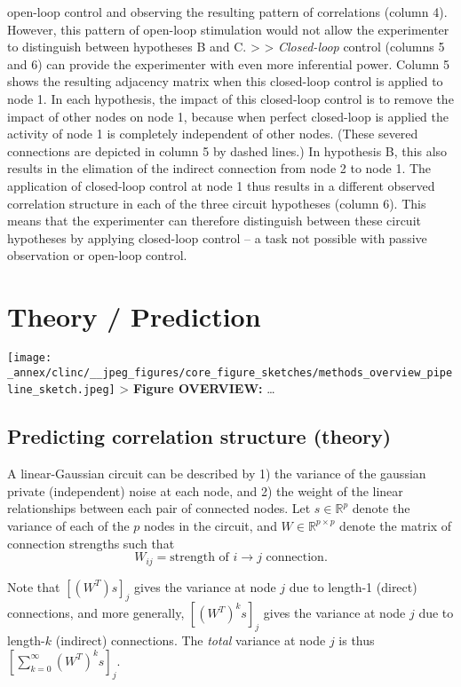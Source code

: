 open-loop control and observing the resulting pattern of correlations
(column 4). However, this pattern of open-loop stimulation would not
allow the experimenter to distinguish between hypotheses B and C.
\textgreater{} \textgreater{} \emph{Closed-loop} control (columns 5 and
6) can provide the experimenter with even more inferential power. Column
5 shows the resulting adjacency matrix when this closed-loop control is
applied to node 1. In each hypothesis, the impact of this closed-loop
control is to remove the impact of other nodes on node 1, because when
perfect closed-loop is applied the activity of node 1 is completely
independent of other nodes. (These severed connections are depicted in
column 5 by dashed lines.) In hypothesis B, this also results in the
elimation of the indirect connection from node 2 to node 1. The
application of closed-loop control at node 1 thus results in a different
observed correlation structure in each of the three circuit hypotheses
(column 6). This means that the experimenter can therefore distinguish
between these circuit hypotheses by applying closed-loop control -- a
task not possible with passive observation or open-loop control.

\hypertarget{theory-prediction}{%
\section{Theory / Prediction}\label{theory-prediction}}

\texttt{[image: \_annex/clinc/\_\_jpeg\_figures/core\_figure\_sketches/methods\_overview\_pipeline\_sketch.jpeg]}
\textgreater{} \textbf{Figure OVERVIEW:} \ldots{}

\hypertarget{predicting-correlation-structure-theory}{%
\subsection{Predicting correlation structure
(theory)}\label{predicting-correlation-structure-theory}}

A linear-Gaussian circuit can be described by 1) the variance of the
gaussian private (independent) noise at each node, and 2) the weight of
the linear relationships between each pair of connected nodes. Let
\(s \in \mathbb{R}^p\) denote the variance of each of the \(p\) nodes in
the circuit, and \(W \in \mathbb{R}^{p \times p}\) denote the matrix of
connection strengths such that
\[W_{ij} = \text{strength of $i \to j$ connection}.\]

Note that \(\left[(W^T) s\right]_j\) gives the variance at node \(j\)
due to length-1 (direct) connections, and more generally,
\(\left[ (W^T)^k s \right]_j\) gives the variance at node \(j\) due to
length-\(k\) (indirect) connections. The \emph{total} variance at node
\(j\) is thus \(\left[ \sum_{k=0}^{\infty} (W^T)^k s \right]_j\).

